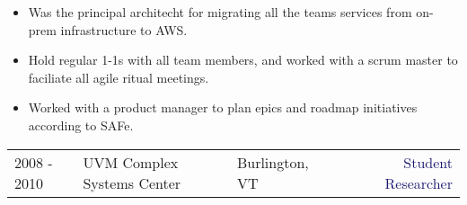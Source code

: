 \documentclass[12t]{article}
\begin{document}
\begin{multicols}{2}
\begin{small}
\begin{itemize}[leftmargin=*,label=\tiny{$\bullet$}]
    \item\begin{minipage}[t]{\linewidth}{Was the principal architecht for migrating all the teams services from on-prem infrastructure to AWS.}\end{minipage}
    \item\begin{minipage}[t]{\linewidth}{Hold regular 1-1s with all team members, and worked with a scrum master to faciliate all agile ritual meetings.}\end{minipage}
    \item\begin{minipage}[t]{\linewidth}{Worked with a product manager to plan epics and roadmap initiatives according to SAFe.}\end{minipage}
    \end{itemize}
  \end{small} 
\end{multicols}

\pagebreak
\vspace{15pt}\begin{tabularx}{\textwidth}{@{}lllXr}
  2008 - 2010&\textcolor{Mahogany}{UVM Complex Systems Center}&\textcolor{Black!80}{Burlington, VT}&&\textcolor{MidnightBlue}{Student Researcher}
\end{tabularx}
\end{document}
